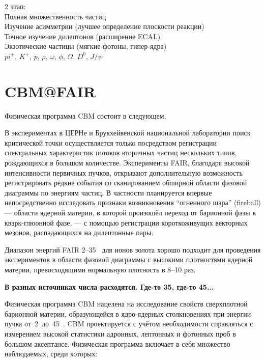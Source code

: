 2 этап: \\
Полная множественность частиц \\
Изучение асимметрии (лучшее определение плоскости реакции) \\
Точное изучение дилептонов (расширение ECAL) \\
Экзотические частицы (мягкие фотоны, гипер-ядра) \\


$pi^{+}$, $K^{+}$, $p$, $\rho$, $\omega$, $\phi$, $\Omega$, $D^{0}$, $J/\psi$

\section{CBM@FAIR}

Физическая программа CBM состоит в следующем.

В экспериментах в ЦЕРНе и Брукхейвенской национальной лаборатории поиск критической точки осуществляется только посредством регистрации спектральных характеристик потоков вторичных частиц нескольких типов, рождающихся в большом количестве. Эксперименты FAIR, благодаря высокой интенсивности первичных пучков, открывают дополнительную возможность регистрировать редкие события со сканированием обширной области фазовой диаграммы по энергиям частиц. В частности планируется впервые непосредственно исследовать признаки возникновения ``огненного шара'' (fireball) --- области ядерной материи, в которой произошёл переход от барионной фазы к кварк-глюонной фазе, --- с помощью регистрации короткоживущих векторных мезонов, распадающихся на дилептонные пары.

Диапазон энергий FAIR 2--35~\GeVperNucl{} для ионов золота хорошо подходит для проведения экспериментов в области фазовой диаграммы с высокими плотностями ядерной материи, превосходящими нормальную плотность в 8--10 раз.

\todo \textbf{В разных источниках числа расходятся. Где-то 35, где-то 45...}

Физическая программа CBM нацелена на исследование свойств сверхплотной барионной материи, образующейся в ядро-ядерных столкновениях при энергии пучка от~2~до~45~\GeVperNucl. CBM проектируется с учётом необходимости справляться с измерением высокой статистики адронных, лептонных и фотонных проб в большом аксептансе. Физическая программа включает в себя множество наблюдаемых, среди которых:

